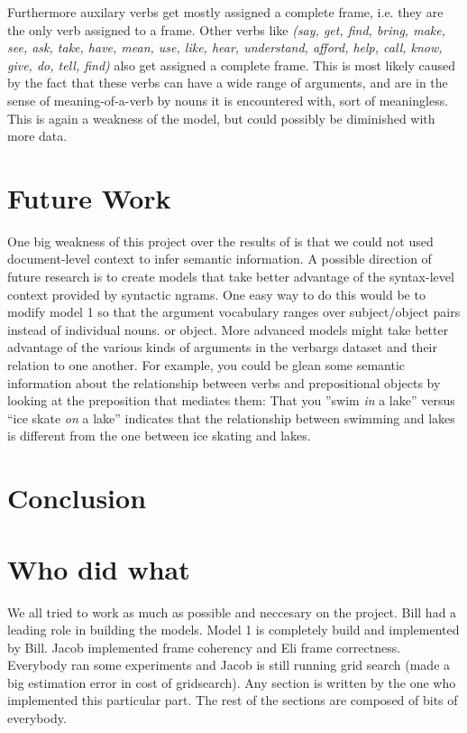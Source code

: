 \documentclass{article} %
\begin{document}
Furthermore auxilary verbs get mostly assigned a complete frame, i.e. they are the only verb assigned to a frame. Other verbs like \textit{(say, get, find, bring, make, see, ask, take, have, mean, use, like, hear, understand, afford, help, call, know, give, do, tell, find)} also get assigned a complete frame. This is most likely caused by the fact that these verbs can have a wide range of arguments, and are in the sense of meaning-of-a-verb by nouns it is encountered with, sort of meaningless. This is again a weakness of the model, but could possibly be diminished with more data.   

\section{Future Work}
One big weakness of this project over the results of \citet{oconnor2013} is that 
we could not used document-level context to infer semantic information.
A possible direction of future research is to create models that take better 
advantage of the syntax-level context provided by syntactic ngrams. 
One easy way to do this would be to modify model 1 so that the argument 
vocabulary ranges over subject/object pairs instead of individual nouns.
or object.
More advanced models might take better advantage of the various kinds of arguments
in the verbargs dataset and their relation to one another.
For example, you could be glean some semantic information about the relationship between
verbs and prepositional objects by looking at the preposition that mediates them: 
That you ''swim \emph{in} a lake'' versus ``ice skate \emph{on} a lake'' 
indicates that the relationship between swimming and lakes is different from the one between
ice skating and lakes.

\section{Conclusion}


\section*{Who did what}
We all tried to work as much as possible and neccesary on the project. Bill had a leading role in building the models. Model 1 is completely build and implemented by Bill. Jacob implemented frame coherency and Eli frame correctness. Everybody ran some experiments and Jacob is still running grid search (made a big estimation error in cost of gridsearch). Any section is written by the one who implemented this particular part. The rest of the sections are composed of bits of everybody. 


\end{document}
